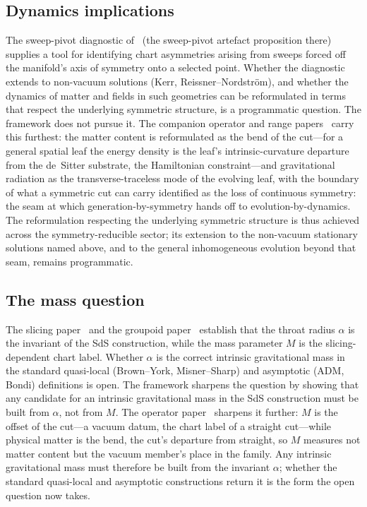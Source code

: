 \documentclass[11pt,a4paper]{article}
\theoremstyle{definition}
\begin{document}
\subsection{Dynamics implications}\label{sec:dynamics}

The sweep-pivot diagnostic of~\cite{JanzenGroupoid} (the sweep-pivot artefact proposition there) supplies a tool for identifying chart asymmetries arising from sweeps forced off the manifold's axis of symmetry onto a selected point. Whether the diagnostic extends to non-vacuum solutions (Kerr, Reissner--Nordstr\"om), and whether the dynamics of matter and fields in such geometries can be reformulated in terms that respect the underlying symmetric structure, is a programmatic question. The framework does not pursue it. The companion operator and range papers~\cite{JanzenOperator, JanzenRange} carry this furthest: the matter content is reformulated as the bend of the cut---for a general spatial leaf the energy density is the leaf's intrinsic-curvature departure from the de~Sitter substrate, the Hamiltonian constraint---and gravitational radiation as the transverse-traceless mode of the evolving leaf, with the boundary of what a symmetric cut can carry identified as the loss of continuous symmetry: the seam at which generation-by-symmetry hands off to evolution-by-dynamics. The reformulation respecting the underlying symmetric structure is thus achieved across the symmetry-reducible sector; its extension to the non-vacuum stationary solutions named above, and to the general inhomogeneous evolution beyond that seam, remains programmatic.

\subsection{The mass question}\label{sec:mass-question}

The slicing paper~\cite{JanzenSlicing} and the groupoid paper~\cite{JanzenGroupoid} establish that the throat radius $\alpha$ is the invariant of the SdS construction, while the mass parameter $M$ is the slicing-dependent chart label. Whether $\alpha$ is the correct intrinsic gravitational mass in the standard quasi-local (Brown--York, Misner--Sharp) and asymptotic (ADM, Bondi) definitions is open. The framework sharpens the question by showing that any candidate for an intrinsic gravitational mass in the SdS construction must be built from $\alpha$, not from $M$. The operator paper~\cite{JanzenOperator} sharpens it further: $M$ is the offset of the cut---a vacuum datum, the chart label of a straight cut---while physical matter is the bend, the cut's departure from straight, so $M$ measures not matter content but the vacuum member's place in the family. Any intrinsic gravitational mass must therefore be built from the invariant $\alpha$; whether the standard quasi-local and asymptotic constructions return it is the form the open question now takes.
\end{document}
